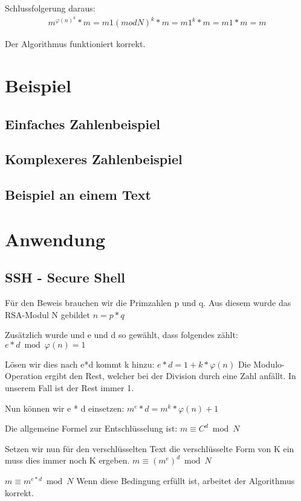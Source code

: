 Schlussfolgerung daraus:
 \begin{align}
	m^{\varphi(n)}^k * m = m
	1(mod N)^k * m = m
	1^k * m = m
	1 * m = m
 \end{align}
 
 Der Algorithmus funktioniert korrekt. 





\section{Beispiel}
\subsection{Einfaches Zahlenbeispiel}
\subsection{Komplexeres Zahlenbeispiel}
\subsection{Beispiel an einem Text}
\section{Anwendung}
\subsection{SSH - Secure Shell}

Für den Beweis brauchen wir die Primzahlen p und q. Aus diesem wurde das RSA-Modul N gebildet
$ n = p * q $

Zusätzlich wurde und e und d so gewählt, dass folgendes zählt:
$ e * d \bmod \varphi(n) = 1 $

Lösen wir dies nach e*d kommt k hinzu:
$ e * d = 1 + k * \varphi(n) $
Die Modulo-Operation ergibt den Rest, welcher bei der Division durch eine Zahl anfällt. In unserem Fall ist der Rest immer 1.

Nun können wir e * d einsetzen:
$ m^e*d = m^k*\varphi(n)+1 $


Die allgemeine Formel zur Entschlüsselung ist:
$ m \equiv C^d \bmod N $

Setzen wir nun für den verschlüsselten Text die verschlüsselte Form von K ein muss dies immer noch K ergeben.
$ m \equiv (m^e)^d \bmod N $

$ m \equiv m^{e*d} \bmod N $
Wenn diese Bedingung erfüllt ist, arbeitet der Algorithmus korrekt.

